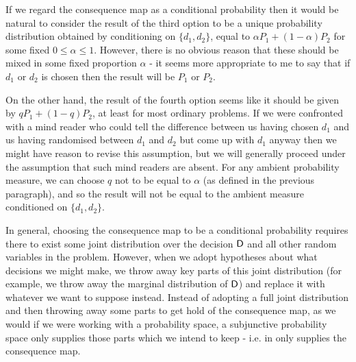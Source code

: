 If we regard the consequence map as a conditional probability then it would be natural to consider the result of the third option to be a unique probability distribution obtained by conditioning on $\{d_1,d_2\}$, equal to  $\alpha P_1 + (1-\alpha)P_2$ for some fixed $0\leq \alpha\leq 1$. However, there is no obvious reason that these should be mixed in some fixed proportion $\alpha$ - it seems more appropriate to me to say that if $d_1$ or $d_2$ is chosen then the result will be $P_1$ or $P_2$.

On the other hand, the result of the fourth option seems like it should be given by $q P_1 + (1-q) P_2$, at least for most ordinary problems. If we were confronted with a mind reader who could tell the difference between us having chosen $d_1$ and us having randomised between $d_1$ and $d_2$ but come up with $d_1$ anyway then we might have reason to revise this assumption, but we will generally proceed under the assumption that such mind readers are absent. For any ambient probability measure, we can choose $q$ not to be equal to $\alpha$ (as defined in the previous paragraph), and so the result will not be equal to the ambient measure conditioned on $\{d_1,d_2\}$. 

In general, choosing the consequence map to be a conditional probability requires there to exist some joint distribution over the decision $\mathsf{D}$ and all other random variables in the problem. However, when we adopt hypotheses about what decisions we might make, we throw away key parts of this joint distribution (for example, we throw away the marginal distribution of $\mathsf{D}$) and replace it with whatever we want to suppose instead. Instead of adopting a full joint distribution and then throwing away some parts to get hold of the consequence map, as we would if we were working with a probability space, a subjunctive probability space only supplies those parts which we intend to keep - i.e. in only supplies the consequence map.

